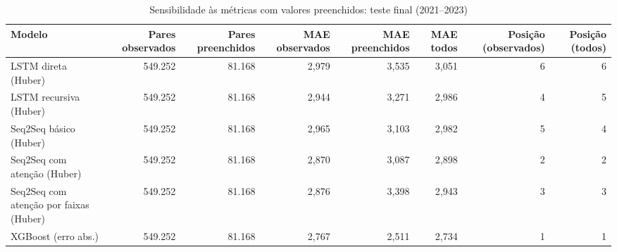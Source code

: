 \begin{table}[!htbp]
    \centering
    \caption{Sensibilidade às métricas com valores preenchidos: teste final (2021--2023)}
    \label{tab:sensibilidade_imputados_holdout}
    \small
    \begin{adjustbox}{max width=\textwidth}
    \begin{tabular}{lrrrrrrr}
        \toprule
        Modelo & Pares observados & Pares preenchidos & MAE observados & MAE preenchidos & MAE todos & Posição (observados) & Posição (todos) \\
        \midrule
        LSTM direta (Huber) & 549.252 & 81.168 & 2,979 & 3,535 & 3,051 & 6 & 6 \\
        LSTM recursiva (Huber) & 549.252 & 81.168 & 2,944 & 3,271 & 2,986 & 4 & 5 \\
        Seq2Seq básico (Huber) & 549.252 & 81.168 & 2,965 & 3,103 & 2,982 & 5 & 4 \\
        Seq2Seq com atenção (Huber) & 549.252 & 81.168 & 2,870 & 3,087 & 2,898 & 2 & 2 \\
        Seq2Seq com atenção por faixas (Huber) & 549.252 & 81.168 & 2,876 & 3,398 & 2,943 & 3 & 3 \\
        XGBoost (erro abs.) & 549.252 & 81.168 & 2,767 & 2,511 & 2,734 & 1 & 1 \\
        \bottomrule
    \end{tabular}
    \end{adjustbox}
\end{table}
